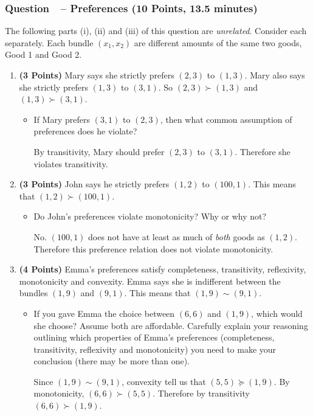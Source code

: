 \documentclass[11pt]{article}
\newcounter{question}[section]
\newcommand{\question}[1]{\refstepcounter{question}
  \subsubsection*{Question~\thequestion~-- #1}}
\newenvironment{subquestions}{
  \begin{enumerate}[label=(\roman*)]}{\end{enumerate}}
\begin{document}
\question{Preferences (10 Points, 13.5 minutes)}
The following parts (i), (ii) and (iii) of this question are \emph{unrelated}.
Consider each separately. Each bundle $\left( x_1,x_2 \right)$ are different amounts of the same two goods, Good 1 and Good 2.
\begin{subquestions}
\item \textbf{(3 Points)} Mary says she strictly prefers $\left( 2,3 \right)$ to $\left( 1,3 \right)$. Mary also says she strictly prefers $\left( 1,3 \right)$ to $\left( 3,1 \right)$. So $\left( 2,3 \right)\succ\left( 1,3 \right)$ and $\left( 1,3\right)\succ \left( 3,1 \right)$.
    \begin{itemize}
      \item If Mary prefers $\left( 3,1\right)$ to $\left( 2,3 \right)$, then what common assumption of preferences does he violate?

        \textcolor{solution-color}{By transitivity, Mary should prefer $\left( 2,3 \right)$ to $\left( 3,1 \right)$. Therefore she violates transitivity.}
    \end{itemize}
  \item \textbf{(3 Points)} John says he strictly prefers $\left( 1,2 \right)$ to $\left( 100,1 \right)$. This means that $\left( 1,2 \right)\succ \left( 100,1 \right)$.
    \begin{itemize}
      \item Do John's preferences violate monotonicity? Why or why not?

        \textcolor{solution-color}{No. $\left( 100,1 \right)$ does not have at least as much of \emph{both} goods as $\left( 1,2 \right)$. Therefore this preference relation does not violate monotonicity.}
    \end{itemize}
  \item \textbf{(4 Points)} Emma's preferences satisfy completeness, transitivity, reflexivity, monotonicity and convexity. Emma says she is indifferent between the bundles $\left( 1,9 \right)$ and $\left( 9,1 \right)$. This means that $\left( 1,9 \right)\sim \left( 9,1 \right)$.
    \begin{itemize}
      \item If you gave Emma the choice between $\left( 6,6 \right)$ and $\left( 1,9 \right)$, which would she choose? Assume both are affordable. Carefully explain your reasoning outlining which properties of Emma's preferences (completeness, transitivity, reflexivity and monotonicity) you need to make your conclusion (there may be more than one).

        \textcolor{solution-color}{Since $\left( 1,9 \right)\sim\left( 9,1 \right)$, convexity tell us that $\left( 5,5 \right)\succeq\left( 1,9 \right)$. By monotonicity, $\left( 6,6 \right)\succ \left( 5,5 \right)$. Therefore by transitivity $\left( 6,6 \right)\succ \left( 1,9 \right)$.}
    \end{itemize}
\end{subquestions}
\end{document}

